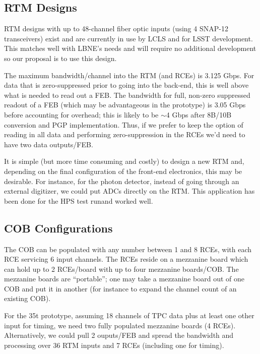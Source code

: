\subsection{RTM Designs}

RTM designs with up to 48-channel fiber optic inputs (using 4 SNAP-12 transceivers) exist and are currently in use by LCLS and for LSST development. This matches well with LBNE's needs and will require no additional development so our proposal is to use this design.  

The maximum bandwidth/channel into the RTM (and RCEs) is 3.125 Gbps.  For data that is zero-suppressed prior to going into the back-end, this is well above what is needed to read out a FEB.    The bandwidth for full, non-zero suppressed readout of a FEB (which may be advantageous in the prototype) is 3.05 Gbps before accounting for overhead;  this is likely to be $\sim$4 Gbps after 8B/10B conversion and PGP implementation.  Thus, if we prefer to keep the option of reading in all data and performing zero-suppression in the RCEs we'd need to have two data outputs/FEB.   

It is simple (but more time consuming and costly) to design a new RTM and, depending on the final configuration of the front-end electronics, this may be desirable.  For instance, for the photon detector, instead of going through an external digitizer, we could put ADCs directly on the RTM.  This application has been done for the HPS test runand worked well.  


\subsection{COB Configurations}

The COB can be populated with any number between 1 and 8 RCEs, with each RCE servicing 6 input channels.  The RCEs reside on a mezzanine board which can hold up to 2 RCEs/board with up to four mezzanine boards/COB.  The mezzanine boards are ``portable''; one may take a mezzanine board out of one COB and put it in another (for instance to expand the channel count of an existing COB).  

For the 35t prototype, assuming 18 channels of TPC data plus at least one other input for timing, we need two fully populated mezzanine boards (4 RCEs).  Alternatively, we could pull 2 ouputs/FEB and spread the bandwidth and processing over 36 RTM inputs and 7 RCEs (including one for timing). 


